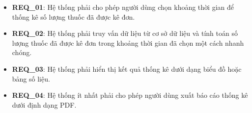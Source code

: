 \begin{itemize}
    \item \textbf{REQ\_01}: Hệ thống phải cho phép người dùng chọn khoảng thời gian để thống kê số lượng thuốc đã được kê đơn.
    \item \textbf{REQ\_02}: Hệ thống phải truy vấn dữ liệu từ cơ sở dữ liệu và tính toán số lượng thuốc đã được kê đơn trong khoảng thời gian đã chọn một cách nhanh chóng.
    \item \textbf{REQ\_03}: Hệ thống phải hiển thị kết quả thống kê dưới dạng biểu đồ hoặc bảng số liệu.
    \item \textbf{REQ\_04}: Hệ thống ít nhất phải cho phép người dùng xuất báo cáo thống kê dưới định dạng PDF.
\end{itemize}
